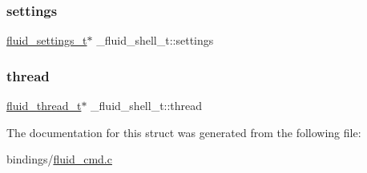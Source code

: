 \subsubsection{\texorpdfstring{settings}{settings}}
{\footnotesize\ttfamily \hyperlink{types_8h_aa363402d3c77333b0f070ba531d034ba}{fluid\+\_\+settings\+\_\+t}$\ast$ \+\_\+fluid\+\_\+shell\+\_\+t\+::settings}

\mbox{\label{struct__fluid__shell__t_ae8d173944c48140af913a50899272897}} 
\subsubsection{\texorpdfstring{thread}{thread}}
{\footnotesize\ttfamily \hyperlink{fluid__sys_8h_a60a6466e68a45b0f0709f1ebaa7e6f85}{fluid\+\_\+thread\+\_\+t}$\ast$ \+\_\+fluid\+\_\+shell\+\_\+t\+::thread}



The documentation for this struct was generated from the following file\+:\begin{DoxyCompactItemize}
\item 
bindings/\hyperlink{fluid__cmd_8c}{fluid\+\_\+cmd.\+c}\end{DoxyCompactItemize}
